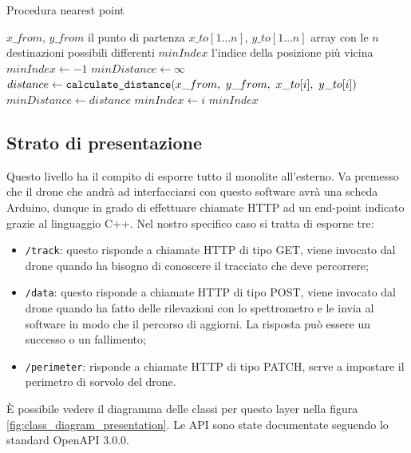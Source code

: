 \begin{algorithm}
    \caption{Procedura nearest point}
    \label{alg:nearest_point}
    \begin{algorithmic}
        \Require $x\_from$, $y\_from$ il punto di partenza
        \Require $x\_to[1 \dotso n]$, $y\_to[1 \dotso n]$ array con le $n$ destinazioni possibili differenti
        \Ensure $minIndex$ l'indice della posizione più vicina
        \State $minIndex \leftarrow -1$
        \State $minDistance \leftarrow \infty$
            \State $distance \leftarrow \verb|calculate_distance|(x\_from,\  y\_from,\  x\_to[i],\  y\_to[i])$
                \State $minDistance \leftarrow distance$
                \State $minIndex \leftarrow i$
            \EndIf
        \EndFor
        \State \Return $minIndex$
    \end{algorithmic}
\end{algorithm}

\subsection{Strato di presentazione}
Questo livello ha il compito di esporre tutto il monolite all'esterno.
Va premesso che il drone che andrà ad interfacciarsi con questo software avrà una scheda Arduino, dunque in grado di effettuare chiamate HTTP ad un end-point indicato grazie al linguaggio C++.
Nel nostro specifico caso si tratta di esporne tre:
\begin{itemize}
    \item \verb|/track|: questo risponde a chiamate HTTP di tipo GET, viene invocato dal drone quando ha bisogno di conoscere il tracciato che deve percorrere;
    \item \verb|/data|: questo risponde a chiamate HTTP di tipo POST, viene invocato dal drone quando ha fatto delle rilevazioni con lo spettrometro e le invia al software in modo che il percorso di aggiorni. La risposta può essere un successo o un fallimento;
    \item \verb|/perimeter|: risponde a chiamate HTTP di tipo PATCH, serve a impostare il perimetro di sorvolo del drone.
\end{itemize}
È possibile vedere il diagramma delle classi per questo layer nella figura \ref{fig:class_diagram_presentation}. Le API sono state documentate seguendo lo standard OpenAPI 3.0.0.

